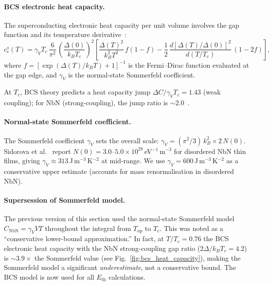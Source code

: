\paragraph{BCS electronic heat capacity.}
The superconducting electronic heat capacity per unit volume
involves the gap function and its temperature
derivative~\cite{Richards1994}: %
\begin{equation}
  c_e^s(T) = \gamma_V T_c \,\frac{6}{\pi^2}\,
  \left(\frac{\Delta(0)}{k_B T_c}\right)^{\!2}
  \left[
    \frac{\Delta(T)^2}{k_B^2 T^2}\,f(1{-}f)
    - \frac{1}{2}\,\frac{d[\Delta(T)/\Delta(0)]^2}{d(T/T_c)}
      \,(1{-}2f)
  \right],
  \label{eq:oq5_bcs_ces}
\end{equation}
where $f = [\exp(\Delta(T)/k_B T) + 1]^{-1}$ is the Fermi--Dirac
function evaluated at the gap edge, and $\gamma_V$ is the normal-state
Sommerfeld coefficient.

At $T_c$, BCS theory predicts a heat capacity jump
$\Delta C / \gamma_V T_c = 1.43$ (weak coupling); for NbN
(strong-coupling), the jump ratio is $\sim\!2.0$~\cite{Chockalingam2008}.

\paragraph{Normal-state Sommerfeld coefficient.}
The Sommerfeld coefficient $\gamma_V$ sets the overall scale:
$\gamma_V = (\pi^2/3)\,k_B^2 \times 2\,N(0)$.
Sidorova et al.~\cite{Sidorova2020} report $N(0) = 3.0$--$5.0 \times
10^{28}$\,eV$^{-1}$\,m$^{-3}$ for disordered NbN thin films,
giving $\gamma_V \approx 313$\,J\,m$^{-3}$\,K$^{-2}$ at mid-range.
We use $\gamma_V = 600$\,J\,m$^{-3}$\,K$^{-2}$ as a conservative
upper estimate (accounts for mass renormalisation in disordered NbN).

\paragraph{Supersession of Sommerfeld model.}
The previous version of this section used the normal-state
Sommerfeld model $C_\mathrm{NbN} = \gamma_V V T$ throughout
the integral from $T_\mathrm{op}$ to $T_c$. This was noted
as a ``conservative lower-bound approximation.'' In fact, at
$T/T_c = 0.76$ the BCS electronic heat capacity with the
NbN strong-coupling gap ratio ($2\Delta/k_B T_c = 4.2$) is
$\sim\!3.9\times$ the Sommerfeld value
(see Fig.~\ref{fig:bcs_heat_capacity}), making the Sommerfeld
model a significant \emph{underestimate}, not a conservative bound.
The BCS model is now used for all $E_\mathrm{th}$ calculations.

